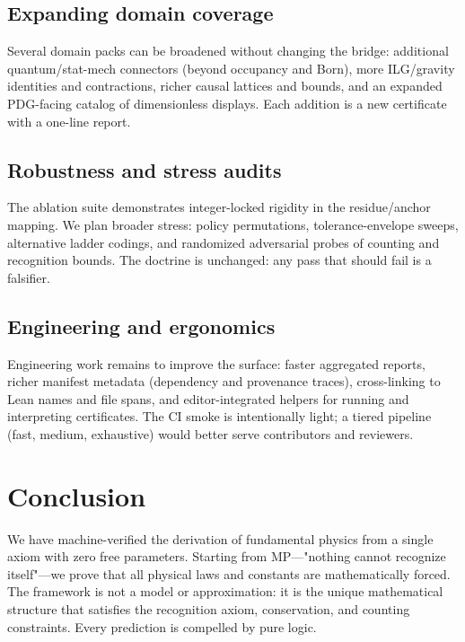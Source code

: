 \documentclass[11pt,a4paper,twoside]{article}
\numberwithin{equation}{section}
\theoremstyle{customthm}
\theoremstyle{customdef}
\theoremstyle{customrem}
\begin{document}
\subsection{Expanding domain coverage}\label{subsec:limits-coverage}

Several domain packs can be broadened without changing the bridge: additional quantum/stat-mech connectors (beyond occupancy and Born), more ILG/gravity identities and contractions, richer causal lattices and bounds, and an expanded PDG-facing catalog of dimensionless displays. Each addition is a new certificate with a one-line report.

\subsection{Robustness and stress audits}\label{subsec:limits-robustness}

The ablation suite demonstrates integer-locked rigidity in the residue/anchor mapping. We plan broader stress: policy permutations, tolerance-envelope sweeps, alternative ladder codings, and randomized adversarial probes of counting and recognition bounds. The doctrine is unchanged: any pass that should fail is a falsifier.

\subsection{Engineering and ergonomics}\label{subsec:limits-eng}

Engineering work remains to improve the surface: faster aggregated reports, richer manifest metadata (dependency and provenance traces), cross-linking to Lean names and file spans, and editor-integrated helpers for running and interpreting certificates. The CI smoke is intentionally light; a tiered pipeline (fast, medium, exhaustive) would better serve contributors and reviewers.

\section{Conclusion}\label{sec:conclusion}

We have machine-verified the derivation of fundamental physics from a single axiom with zero free parameters. Starting from MP—"nothing cannot recognize itself"—we prove that all physical laws and constants are mathematically forced. The framework is not a model or approximation: it is the unique mathematical structure that satisfies the recognition axiom, conservation, and counting constraints. Every prediction is compelled by pure logic.
\end{document}
